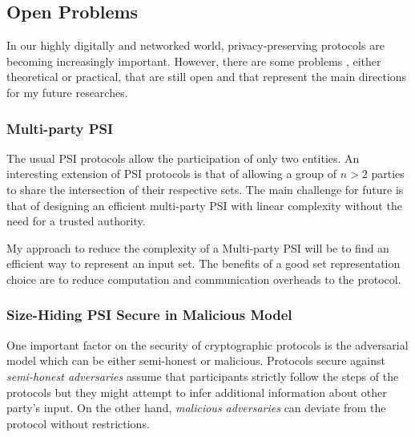 \documentclass[dvips,12pt]{article}
\begin{document}

\subsection{Open Problems}
In our highly digitally and networked world, privacy-preserving protocols are becoming increasingly important. 
However, there are some problems \cite{dissertation}, either theoretical or practical, that are still open and that represent the main directions for my future researches.
\subsubsection{Multi-party PSI}
The usual PSI protocols allow the participation of only two entities. 
An interesting extension of PSI protocols is that of allowing a group of $n > 2$ parties to share the intersection of their respective sets. The main challenge for future is that of designing an efficient multi-party PSI with linear complexity without the need for a trusted authority.

My approach to reduce the complexity of a Multi-party PSI will be to find an efficient way to represent an input set. The benefits of a good set representation choice are to reduce computation and communication overheads to the protocol. 

\subsubsection{Size-Hiding PSI Secure in Malicious Model}
One important factor on the security of cryptographic protocols is the adversarial model which can be either semi-honest or malicious. 
Protocols secure against \emph{semi-honest adversaries} assume that participants strictly follow the steps of the protocols but they might attempt to infer additional information about other party's input. On the other hand, \emph{malicious adversaries} can deviate from the protocol without restrictions.
\end{document}
